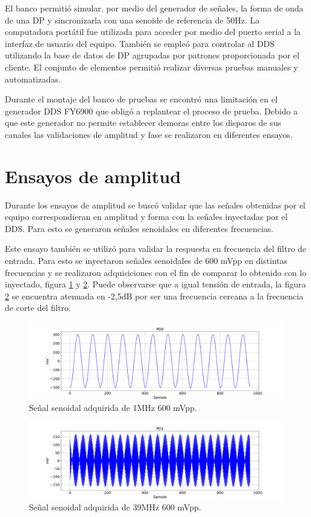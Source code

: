 El banco permitió simular, por medio del generador de señales, la forma de onda de una DP y sincronizarla con una senoide de referencia de 50Hz. La computadora portátil fue utilizada para acceder por medio del puerto serial a la interfaz de usuario del equipo. También se empleó para controlar al DDS utilizando la base de datos de DP agrupadas por patrones proporcionada por el cliente.
El conjunto de elementos permitió realizar diversas pruebas manuales y automatizadas.

Durante el montaje del banco de pruebas se encontró una limitación en el generador DDS FY6900 que obligó a replantear el proceso de prueba. Debido a que este generador no permite establecer demoras entre los disparos de sus canales las validaciones de amplitud y fase se realizaron en diferentes ensayos.

\section{Ensayos de amplitud}
Durante los ensayos de amplitud se buscó validar que las señales obtenidas por el equipo correspondieran en amplitud y forma con la señales inyectadas por el DDS. Para esto se generaron señales senoidales en diferentes frecuencias.

Este ensayo también se utilizó para validar la respuesta en frecuencia del filtro de entrada. Para esto se inyectaron señales senoidales de 600 mVpp en distintas frecuencias y se realizaron adquisiciones con el fin de comparar lo obtenido con lo inyectado, figura \ref{fig:sin1} y \ref{fig:sin39}. Puede observarse que a igual tensión de entrada, la figura \ref{fig:sin39} se encuentra atenuada en -2,5dB por ser una frecuencia cercana a la frecuencia de corte del filtro. 

\begin{figure}[htpb]
	\hspace{-1.2cm}
	\includegraphics[width=165mm]{./Figures/sin1.png}
	\caption{Señal senoidal adquirida de 1MHz 600 mVpp.}
	\label{fig:sin1}
\end{figure}

\begin{figure}[htpb]
	\hspace{-1.2cm}
	\includegraphics[width=165mm]{./Figures/sin39.png}
	\caption{Señal senoidal adquirida de 39MHz 600 mVpp.}
	\label{fig:sin39}
\end{figure}

